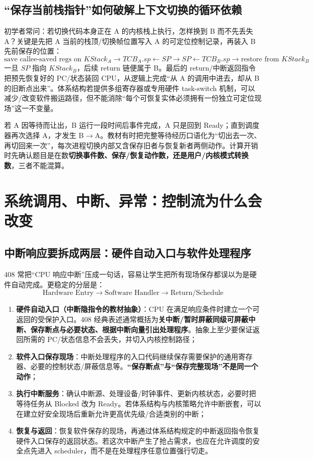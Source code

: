 \documentclass[11pt,a4paper]{ctexart}
\newcommand{\kw}[1]{\textbf{#1}}
\begin{document}
\subsection{“保存当前栈指针”如何破解上下文切换的循环依赖}

初学者常问：若切换代码本身正在 A 的内核栈上执行，怎样换到 B 而不先丢失 A？关键是先把 A 当前的栈顶/切换帧位置写入 A 的可定位控制记录，再装入 B 先前保存的位置：
\[
\boxed{
\text{save callee-saved regs on }KStack_A
\to TCB_A.sp\leftarrow SP
\to SP\leftarrow TCB_B.sp
\to \text{restore from }KStack_B
}
\]
一旦 $SP$ 指向 $KStack_B$，后续 return 链便属于 B。最后的 return/中断返回指令把预先恢复好的 PC/状态装回 CPU，从逻辑上完成“从 A 的调用中进去，却从 B 的旧断点出来”。体系结构若提供多组寄存器或专用硬件 task-switch 机制，可以减少/改变软件搬运路径，但不能消除“每个可恢复实体必须拥有一份独立可定位现场”这一不变量。

\begin{exam}
若 A 因等待而让出，B 运行一段时间后事件完成，A 只是回到 Ready；直到调度器再次选择 A，才发生 B$\to$A。教材有时把完整等待经历口语化为“切出去一次、再切回来一次”，每次进程切换内部又含保存旧者与恢复新者两侧动作。计算开销时先确认题目是在数\kw{切换事件数、保存/恢复动作数，还是用户/内核模式转换数}，三者不能混算。
\end{exam}

\section{系统调用、中断、异常：控制流为什么会改变}

\subsection{中断响应要拆成两层：硬件自动入口与软件处理程序}

408 常把“CPU 响应中断”压成一句话，容易让学生把所有现场保存都误以为是硬件自动完成。更稳定的分层是：
\[
\boxed{\text{Hardware Entry}\rightarrow\text{Software Handler}\rightarrow\text{Return/Schedule}}
\]

\begin{enumerate}
\item \kw{硬件自动入口（中断隐指令的教材抽象）}：CPU 在满足响应条件时建立一个可返回的受保护入口。408 经典表述通常概括为\kw{关中断/暂时屏蔽同级可屏蔽中断、保存断点与必要状态、根据中断向量引出处理程序}。抽象上至少要保证返回所需的 PC/状态信息不会丢失，并切入内核控制路径；
\item \kw{软件入口保存现场}：中断处理程序的入口代码继续保存需要保护的通用寄存器、必要的控制状态/屏蔽信息等。\kw{“保存断点”与“保存完整现场”不是同一个动作}；
\item \kw{执行中断服务}：确认中断源、处理设备/时钟事件、更新内核状态，必要时把等待任务从 Blocked 改为 Ready。若体系结构与内核策略允许中断嵌套，可以在建立好安全现场后重新允许更高优先级/合适类别的中断；
\item \kw{恢复与返回}：恢复软件保存的现场，再通过体系结构规定的中断返回指令恢复硬件入口保存的返回状态。若这次中断产生了抢占需求，也应在允许调度的安全点先进入 scheduler，而不是在处理程序任意位置强行切走。
\end{enumerate}
\end{document}
